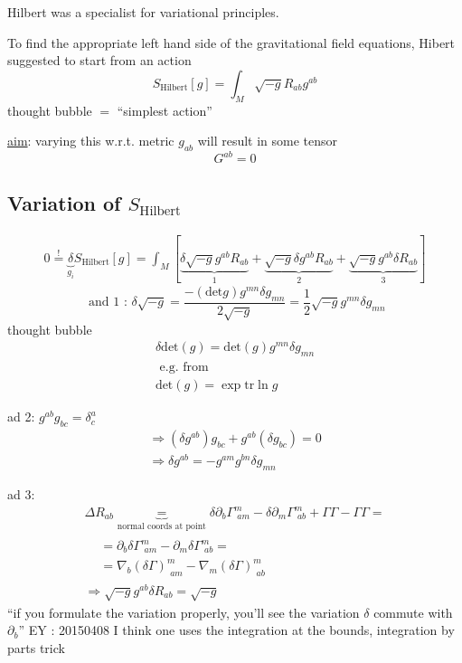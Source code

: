\documentclass[10pt, twoside]{amsart}
\begin{document}
\begin{multicols*}{2}
Hilbert was a specialist for variational principles. 

To find the appropriate left hand side of the gravitational field equations, Hibert suggested to start from an action
\[
S_{\text{Hilbert}}[g] = \int_M \sqrt{-g} R_{ab}g^{ab}
\]
thought bubble $=$ ``simplest action''

\underline{aim}: varying this w.r.t. metric $g_{ab}$ will result in some tensor 
\[
G^{ab} = 0
\]

\subsection{Variation of $S_{\text{Hilbert}}$}

\[
\begin{gathered}
  0 \overset{!}{=} \underbrace{\delta}_{g_i} S_{\text{Hilbert}}[g] = \int_M [ \underbrace{ \delta \sqrt{-g} g^{ab}R_{ab} }_{1} + \underbrace{ \sqrt{-g} \delta g^{ab} R_{ab}}_{2} + \underbrace{ \sqrt{-g} g^{ab} \delta R_{ab} }_{3} ] 
\end{gathered}
\]
\[
\text{ and 1 : } \delta \sqrt{-g} = \frac{ - (\text{det}g)g^{mn} \delta g_{mn} }{ 2 \sqrt{-g}} = \frac{1}{2} \sqrt{-g} g^{mn} \delta g_{mn}
\]
thought bubble
\[
\begin{gathered}
  \delta \text{det}(g) = \text{det}(g) g^{mn} \delta g_{mn} \\ 
  \text{ e.g. from } \\
\text{det}(g) = \exp{ \text{tr}{ \ln{g} } }
\end{gathered}
\]

ad 2: $g^{ab}g_{bc} = \delta^a_c$
\[
\begin{gathered}
\Longrightarrow (\delta g^{ab})g_{bc} + g^{ab}(\delta g_{bc}) = 0  \\
 \Longrightarrow \delta g^{ab} = -g^{am} g^{bn} \delta g_{mn}
\end{gathered}
\]

ad 3: 
\[
\begin{gathered}
  \Delta R_{ab} \underbrace{=}_{\text{normal coords at point}} \delta \partial_b \Gamma^m_{ \, \, am} - \delta \partial_m \Gamma^m_{ \, \, ab} + \Gamma \Gamma - \Gamma \Gamma = \\
  \begin{aligned}
    & = \partial_b \delta \Gamma^m_{ \, \, am} - \partial_m \delta \Gamma^m_{ \, \, ab } = \\  
    & = \nabla_b (\delta \Gamma)^m_{ \, \, am} - \nabla_m (\delta \Gamma)^m_{ \, \, ab}
\end{aligned} \\
\Longrightarrow \sqrt{-g} g^{ab} \delta R_{ab} = \sqrt{-g}
\end{gathered}
\]
``if you formulate the variation properly, you'll see the variation $\delta$ commute with $\partial _b$'' EY : 20150408 I think one uses the integration at the bounds, integration by parts trick


\end{multicols*}
\end{document}
